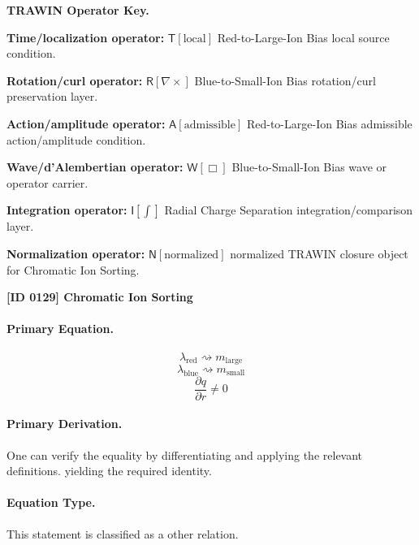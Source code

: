 \par\vspace{0.45\baselineskip}
\noindent\begin{minipage}[t]{\linewidth}
\begingroup
\small
\raggedright
\textbf{TRAWIN Operator Key.}\par
\noindent\textbf{Time/localization operator:} $\mathsf{T}\!\left[\mathrm{local}\right]$ Red-to-Large-Ion Bias local source condition.\par
\noindent\textbf{Rotation/curl operator:} $\mathsf{R}\!\left[\nabla\times\right]$ Blue-to-Small-Ion Bias rotation/curl preservation layer.\par
\noindent\textbf{Action/amplitude operator:} $\mathsf{A}\!\left[\mathrm{admissible}\right]$ Red-to-Large-Ion Bias admissible action/amplitude condition.\par
\noindent\textbf{Wave/d'Alembertian operator:} $\mathsf{W}\!\left[\Box\right]$ Blue-to-Small-Ion Bias wave or operator carrier.\par
\noindent\textbf{Integration operator:} $\mathsf{I}\!\left[\int\right]$ Radial Charge Separation integration/comparison layer.\par
\noindent\textbf{Normalization operator:} $\mathsf{N}\!\left[\mathrm{normalized}\right]$ normalized TRAWIN closure object for Chromatic Ion Sorting.\par
\endgroup
\end{minipage}

\clearpage
\noindent\textbf{[ID 0129] Chromatic Ion Sorting}\par
\vspace{0.35em}
\paragraph{Primary Equation.}
\[
\lambda_{\mathrm{red}} \rightsquigarrow m_{\mathrm{large}}
\]
\[
\lambda_{\mathrm{blue}} \rightsquigarrow m_{\mathrm{small}}
\]
\[
\frac{\partial q}{\partial r} \neq 0
\]

\paragraph{Primary Derivation.}
One can verify the equality by differentiating and applying the relevant definitions. yielding the required identity.
\paragraph{Equation Type.}
This statement is classified as a other relation.

